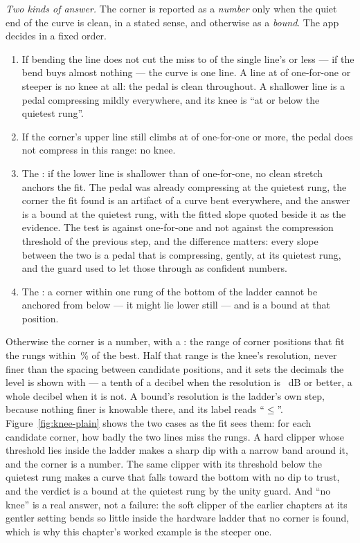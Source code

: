 \documentclass[11pt,a4paper]{article}
\begin{document}
\emph{Two kinds of answer.} The corner is reported as a \emph{number}
only when the quiet end of the curve is clean, in a stated sense, and
otherwise as a \emph{bound}. The app decides in a fixed order.
\begin{enumerate}
  \item If bending the line does not cut the miss to \cmpNoBreakWords{} of
  the single line's or less --- if the bend buys almost nothing --- the
  curve is one line. A line at \cmpUnityGuardWords{} of one-for-one or
  steeper is no knee at all: the pedal is clean throughout. A shallower line is a
  pedal compressing mildly everywhere, and its knee is ``at or below the
  quietest rung''.
  \item If the corner's upper line still climbs at \cmpSlopeThresholdWords{}
  of one-for-one or more, the pedal does not compress in this range: no
  knee.
  \item The : if the lower line is shallower than
  \cmpUnityGuardWords{} of one-for-one, no clean stretch anchors the
  fit. The pedal was already compressing at the quietest rung, the corner
  the fit found is an artifact of a curve bent everywhere, and the answer
  is a bound at the quietest rung, with the fitted slope quoted beside it
  as the evidence. The test is against one-for-one and not against the
  compression threshold of the previous step, and the difference matters:
  every slope between the two is a pedal that is compressing, gently, at
  its quietest rung, and the guard used to let those through as confident
  numbers.
  \item The : a corner within one rung of the bottom of
  the ladder cannot be anchored from below --- it might lie lower still
  --- and is a bound at that position.
\end{enumerate}
Otherwise the corner is a number, with a : the
range of corner positions that fit the rungs within
\cmpResolutionBandPercent{}\,\% of the best. Half that range is the knee's
resolution, never finer than the spacing between candidate positions, and
it sets the decimals the level is shown with --- a tenth of a decibel when
the resolution is \cmpDecimalsBarDB{}~dB or better, a whole decibel when it
is not. A bound's resolution is the ladder's own step, because nothing
finer is knowable there, and its label reads ``$\le$''.
Figure~\ref{fig:knee-plain} shows the two cases as the fit sees them: for
each candidate corner, how badly the two lines miss the rungs. A hard
clipper whose threshold lies inside the ladder makes a sharp dip with a
narrow band around it, and the corner is a number. The same clipper with
its threshold below the quietest rung makes a curve that falls toward the
bottom with no dip to trust, and the verdict is a bound at the quietest
rung by the unity guard. And ``no knee'' is a real answer, not a failure:
the soft clipper of the earlier chapters at its gentler setting bends so
little inside the hardware ladder that no corner is found, which is why
this chapter's worked example is the steeper one.
\end{document}
